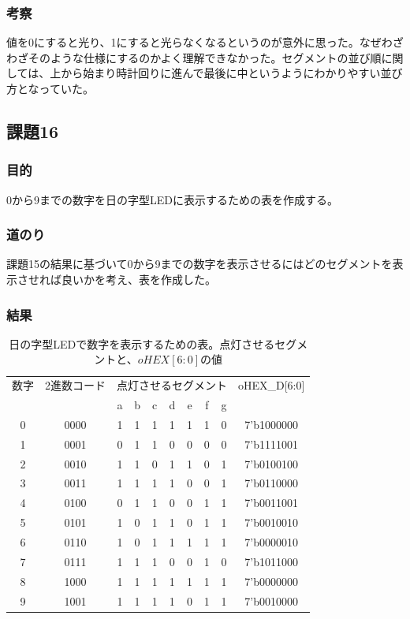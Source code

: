 \documentclass[a4paper]{jarticle}
\begin{document}
\subsubsection{考察}
値を0にすると光り、1にすると光らなくなるというのが意外に思った。なぜわざわざそのような仕様にするのかよく理解できなかった。セグメントの並び順に関しては、上から始まり時計回りに進んで最後に中というようにわかりやすい並び方となっていた。
\subsection{課題16}
\subsubsection{目的}
0から9までの数字を日の字型LEDに表示するための表を作成する。
\subsubsection{道のり}
課題15の結果に基づいて0から9までの数字を表示させるにはどのセグメントを表示させれば良いかを考え、表を作成した。
\subsubsection{結果}
\begin{table}[H]
	\begin{center}
		\caption{日の字型LEDで数字を表示するための表。点灯させるセグメントと、$oHEX[6:0]$の値}
		\label{Work16Table}
		\begin{tabular}{|c|c|c|c|c|c|c|c|c|c|}
		\hline
		{数字}	&2進数コード	&\multicolumn{7}{|c|}{点灯させるセグメント}		&oHEX\_D[6:0]\\	\cline{3-9}
			&		&a	&b	&c	&d	&e	&f	&g	&\\		\hline
		0	&0000		&1	&1	&1	&1	&1	&1	&0	&7'b1000000\\	\hline
		1	&0001		&0	&1	&1	&0	&0	&0	&0	&7'b1111001\\	\hline
		2	&0010		&1	&1	&0	&1	&1	&0	&1	&7'b0100100\\	\hline
		3	&0011		&1	&1	&1	&1	&0	&0	&1	&7'b0110000\\	\hline
		4	&0100		&0	&1	&1	&0	&0	&1	&1	&7'b0011001\\	\hline
		5	&0101		&1	&0	&1	&1	&0	&1	&1	&7'b0010010\\	\hline
		6	&0110		&1	&0	&1	&1	&1	&1	&1	&7'b0000010\\	\hline
		7	&0111		&1	&1	&1	&0	&0	&1	&0	&7'b1011000\\	\hline
		8	&1000		&1	&1	&1	&1	&1	&1	&1	&7'b0000000\\	\hline
		9	&1001		&1	&1	&1	&1	&0	&1	&1	&7'b0010000\\	\hline
		\end{tabular}
	\end{center}
\end{table}
\end{document}
